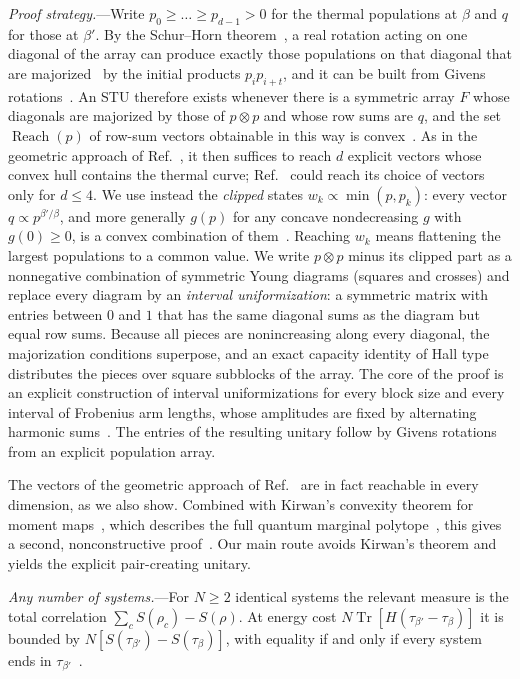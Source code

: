 \documentclass[aps,prl,reprint,superscriptaddress,amsmath,amssymb]{revtex4-2}
\newcommand{\Tr}{\operatorname{Tr}}
\newcommand{\Reach}{\operatorname{Reach}}
\begin{document}
\textit{Proof strategy.}---Write $p_0\ge\dots\ge p_{d-1}>0$ for the thermal populations at $\beta$ and $q$ for those
at $\beta'$. By the Schur--Horn theorem~\cite{Schur1923,Horn1954}, a real rotation acting on one diagonal of the
array can produce exactly those populations on that diagonal that are majorized~\cite{MarshallOlkin2011} by the
initial products $p_ip_{i+t}$, and it can be built from Givens rotations~\cite{ChanLi1983}. An STU therefore exists
whenever there is a symmetric array $F$ whose diagonals are majorized by those of $p\otimes p$ and whose row sums are
$q$, and the set $\Reach(p)$ of row-sum vectors obtainable in this way is convex~\cite{SM}. As in the geometric
approach of Ref.~\cite{Bakhshinezhad2019}, it then suffices to reach $d$ explicit vectors whose convex hull contains
the thermal curve; Ref.~\cite{Bakhshinezhad2019} could reach its choice of vectors only for $d\le4$. We use instead
the \emph{clipped} states $w_k\propto\min(p,p_k)$: every vector $q\propto p^{\beta'/\beta}$, and more generally $g(p)$
for any concave nondecreasing $g$ with $g(0)\ge0$, is a convex combination of them~\cite{SM}. Reaching $w_k$ means
flattening the largest populations to a common value. We write $p\otimes p$ minus its clipped part as a nonnegative
combination of symmetric Young diagrams (squares and crosses) and replace every diagram by an \emph{interval
uniformization}: a symmetric matrix with entries between $0$ and $1$ that has the same diagonal sums as the diagram
but equal row sums. Because all pieces are nonincreasing along every diagonal, the majorization conditions
superpose, and an exact capacity identity of Hall type distributes the pieces over square subblocks of the array. The
core of the proof is an explicit construction of interval uniformizations for every block size and every interval of
Frobenius arm lengths, whose amplitudes are fixed by alternating harmonic sums~\cite{SM}. The entries of the
resulting unitary follow by Givens rotations from an explicit population array.

The vectors of the geometric approach of Ref.~\cite{Bakhshinezhad2019} are in fact reachable in every dimension, as
we also show. Combined with Kirwan's convexity theorem for moment maps~\cite{Kirwan1984}, which describes the full
quantum marginal polytope~\cite{Klyachko2004,Christandl2006}, this gives a second, nonconstructive proof~\cite{SM}.
Our main route avoids Kirwan's theorem and yields the explicit pair-creating unitary.

\textit{Any number of systems.}---For $N\ge2$ identical systems the relevant measure is the total correlation
$\sum_cS(\rho_c)-S(\rho)$. At energy cost $N\Tr[H(\tau_{\beta'}-\tau_\beta)]$ it is bounded by
$N[S(\tau_{\beta'})-S(\tau_\beta)]$, with equality if and only if every system ends in
$\tau_{\beta'}$~\cite{Huber2015}.
\end{document}
